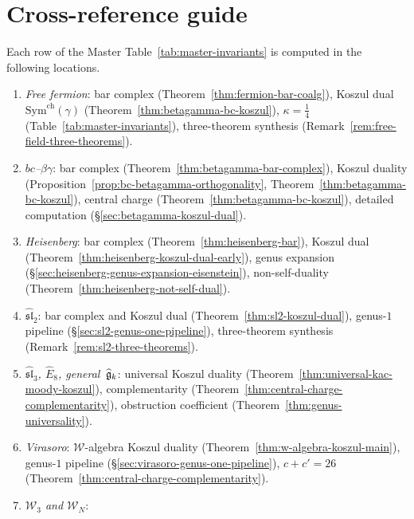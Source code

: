 \section*{Cross-reference guide}
\label{sec:cross-ref-guide}

\begin{remark}\label{rem:cross-ref-guide}
Each row of the Master Table~\textup{\ref{tab:master-invariants}} is
computed in the following locations.
\begin{enumerate}
\item \emph{Free fermion}:
  bar complex (Theorem~\ref{thm:fermion-bar-coalg}),
  Koszul dual $\mathrm{Sym}^{\mathrm{ch}}(\gamma)$
  (Theorem~\ref{thm:betagamma-bc-koszul}),
  $\kappa = \tfrac{1}{4}$ (Table~\ref{tab:master-invariants}),
  three-theorem synthesis
  (Remark~\ref{rem:free-field-three-theorems}).
\item \emph{$bc$--$\beta\gamma$}:
  bar complex (Theorem~\ref{thm:betagamma-bar-complex}),
  Koszul duality
  (Proposition~\ref{prop:bc-betagamma-orthogonality},
  Theorem~\ref{thm:betagamma-bc-koszul}),
  central charge (Theorem~\ref{thm:betagamma-bc-koszul}),
  detailed computation (\S\ref{sec:betagamma-koszul-dual}).
\item \emph{Heisenberg}:
  bar complex (Theorem~\ref{thm:heisenberg-bar}),
  Koszul dual (Theorem~\ref{thm:heisenberg-koszul-dual-early}),
  genus expansion
  (\S\ref{sec:heisenberg-genus-expansion-eisenstein}),
  non-self-duality (Theorem~\ref{thm:heisenberg-not-self-dual}).
\item \emph{$\widehat{\mathfrak{sl}}_2$}:
  bar complex and Koszul dual
  (Theorem~\ref{thm:sl2-koszul-dual}),
  genus-$1$ pipeline (\S\ref{sec:sl2-genus-one-pipeline}),
  three-theorem synthesis (Remark~\ref{rem:sl2-three-theorems}).
\item \emph{$\widehat{\mathfrak{sl}}_3$, $\widehat{E}_8$,
  general~$\widehat{\mathfrak{g}}_k$}:
  universal Koszul duality
  (Theorem~\ref{thm:universal-kac-moody-koszul}),
  complementarity
  (Theorem~\ref{thm:central-charge-complementarity}),
  obstruction coefficient
  (Theorem~\ref{thm:genus-universality}).
\item \emph{Virasoro}:
  $\mathcal{W}$-algebra Koszul duality
  (Theorem~\ref{thm:w-algebra-koszul-main}),
  genus-$1$ pipeline (\S\ref{sec:virasoro-genus-one-pipeline}),
  $c + c' = 26$
  (Theorem~\ref{thm:central-charge-complementarity}).
\item \emph{$\mathcal{W}_3$ and $\mathcal{W}_N$}:

\end{enumerate}
\end{remark}
